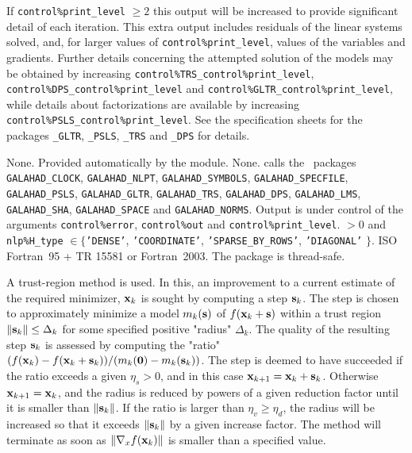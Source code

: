 \documentclass{galahad}
\newcommand{\packagename}{TRU}
\begin{document}
If {\tt control\%print\_level} $\geq 2$ this
output will be increased to provide significant detail of each iteration.
This extra output includes residuals of the linear systems solved, and,
for larger values of {\tt control\%print\_level}, values of the variables
and gradients. Further details concerning the attempted solution of the models
may be obtained by increasing
{\tt control\%TRS\_control\%print\_level},
{\tt control\%DPS\_control\%print\_level}
and
{\tt control\%GLTR\_control\%print\_level},
while details about factorizations are available
by increasing
{\tt control\%PSLS\_control\%print\_level}.
See the specification sheets for the packages
{\tt \libraryname\_GLTR},
{\tt \libraryname\_PSLS},
{\tt \libraryname\_TRS} and
{\tt \libraryname\_DPS}
for details.


\galgeneral

\galcommon None.
\galworkspace Provided automatically by the module.
\galroutines None.
\galmodules {\tt \packagename\_solve} calls the \galahad\ packages
{\tt GALAHAD\_CLOCK},
{\tt GALAHAD\_NLPT},
{\tt GALAHAD\_SY\-M\-BOLS}, \sloppy
{\tt GALAHAD\_SPECFILE},
{\tt GALAHAD\_PSLS},
{\tt GALAHAD\_GLTR},
{\tt GALAHAD\_TRS},
{\tt GALAHAD\_DPS},
{\tt GALAHAD\_LMS},
{\tt GALAHAD\_SHA},
{\tt GALAHAD\_SPACE} and
{\tt GALAHAD\_NORMS}.
\galio Output is under control of the arguments
 {\tt control\%error}, {\tt control\%out} and {\tt control\%print\_level}.
 $> 0$ and
{\tt nlp\%H\_type} $\in \{${\tt 'DENSE'},
 {\tt 'COORDINATE'}, {\tt 'SPARSE\_BY\_ROWS'}, {\tt 'DIAGONAL'} $\}$.
\galportability ISO Fortran~95 + TR 15581 or Fortran~2003.
The package is thread-safe.


\galmethod
A trust-region method is used. In this, an improvement to a current
estimate of the required minimizer, ${\mathbf{x}}_k$ is sought by computing a
step ${\mathbf{s}}_k$. The step is chosen to approximately minimize a model $m_k({\mathbf{s}})$
of $f({\mathbf{x}}_k + {\mathbf{s}})$ within a trust region $\|{\mathbf{s}}_k\| \leq \Delta_k$
for some specified positive "radius" $\Delta_k$. The quality of the
resulting step ${\mathbf{s}}_k$ is assessed by computing the "ratio"
$(f({\mathbf{x}}_k) - f({\mathbf{x}}_k + {\mathbf{s}}_k))/ (m_k({\mathbf{0}}) - m_k({\mathbf{s}}_k))$.
The step is deemed to have succeeded if the ratio exceeds a given $\eta_s > 0$,
and in this case ${\mathbf{x}}_{k+1} = {\mathbf{x}}_k + {\mathbf{s}}_k$. Otherwise
${\mathbf{x}}_{k+1} = {\mathbf{x}}_k$, and the radius is reduced by powers of a given
reduction factor until it is smaller than $\|{\mathbf{s}}_k\|$. If the ratio
is larger than  $\eta_v \geq \eta_d$, the radius will be increased so that
it exceeds $\|{\mathbf{s}}_k\|$ by a given increase factor. The method will terminate
as soon as $\|\nabla_x f({\mathbf{x}}_k)\|$ is smaller than a specified value.
\end{document}
